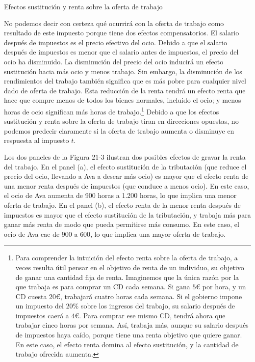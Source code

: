 \documentclass[10pt,a4paper]{article}
\begin{document}
Efectos sustitución y renta sobre la oferta de trabajo

No podemos decir con certeza qué ocurrirá con la oferta de trabajo como resultado de este impuesto porque tiene dos efectos compensatorios. El salario después de impuestos es el precio efectivo del ocio. Debido a que el salario después de impuestos es menor que el salario antes de impuestos, el precio del ocio ha disminuido. La disminución del precio del ocio inducirá un efecto sustitución hacia más ocio y menos trabajo. Sin embargo, la disminución de los rendimientos del trabajo también significa que es más pobre para cualquier nivel dado de oferta de trabajo. Esta reducción de la renta tendrá un efecto renta que hace que compre menos de todos los bienes normales, incluido el ocio; y menos horas de ocio significan más horas de trabajo.\footnote{%
    Para comprender la intuición del efecto renta sobre la oferta de trabajo, a veces resulta útil pensar en el objetivo de renta de un individuo, su objetivo de ganar una cantidad fija de renta. Imaginemos que la única razón por la que trabaja es para comprar un CD cada semana. Si gana $5€$ por hora, y un CD cuesta $20€$, trabajará cuatro horas cada semana. Si el gobierno impone un impuesto del $20\%$ sobre los ingresos del trabajo, su salario después de impuestos caerá a $4€$. Para comprar ese mismo CD, tendrá ahora que trabajar cinco horas por semana. Así, trabaja más, aunque su salario después de impuestos haya caído, porque tiene una renta objetivo que quiere ganar. En este caso, el efecto renta domina al efecto sustitución, y la cantidad de trabajo ofrecida aumenta.
} Debido a que los efectos sustitución y renta sobre la oferta de trabajo tiran en direcciones opuestas, no podemos predecir claramente si la oferta de trabajo aumenta o disminuye en respuesta al impuesto $t$.

Los dos paneles de la Figura 21-3 ilustran dos posibles efectos de gravar la renta del trabajo. En el panel (a), el efecto sustitución de la tributación (que reduce el precio del ocio, llevando a Ava a desear más ocio) es mayor que el efecto renta de una menor renta después de impuestos (que conduce a menos ocio). En este caso, el ocio de Ava aumenta de 900 horas a 1.200 horas, lo que implica una menor oferta de trabajo. En el panel (b), el efecto renta de la menor renta después de impuestos es mayor que el efecto sustitución de la tributación, y trabaja más para ganar más renta de modo que pueda permitirse más consumo. En este caso, el ocio de Ava cae de $900$ a $600$, lo que implica una mayor oferta de trabajo.
\end{document}
